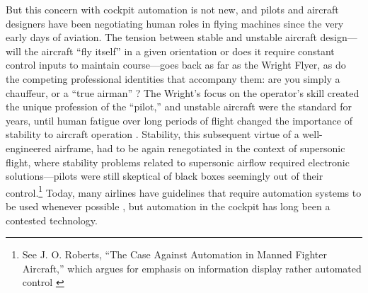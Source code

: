 
 But this concern with cockpit automation is not
new, and pilots and aircraft designers have been negotiating human
roles in flying machines since the very early days of aviation. The
tension between stable and unstable aircraft design---will the
aircraft ``fly itself'' in a given orientation or does it require
constant control inputs to maintain course---goes back as far as the
Wright Flyer, as do the competing professional identities that
accompany them: are you simply a chauffeur, or a ``true
airman'' \cite[p. 21]{DM}? The Wright's focus on the operator's
skill created the unique profession of the
``pilot,'' and unstable aircraft were the standard for years, until
human fatigue over long periods of flight changed the importance of
stability to aircraft operation \cite[p. 22-24]{DM}. Stability,
this subsequent virtue of a well-engineered airframe, had to be again
renegotiated in the context of supersonic flight, where stability
problems related to supersonic airflow required electronic
solutions---pilots were still skeptical of black boxes seemingly out
of their control.\footnote{See J. O. Roberts, ``The Case Against
  Automation in Manned Fighter Aircraft,'' which argues for emphasis on
information display rather automated control \cite[p. 35]{DM}} Today, 
many airlines 
have guidelines that require automation systems to be used
whenever possible \cite[p. 38]{PARCCAST}, but automation in the
cockpit has long been a contested technology. 


